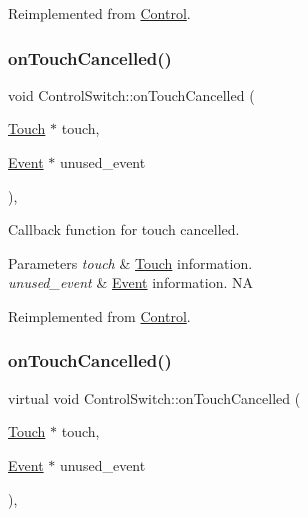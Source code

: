 Reimplemented from \hyperlink{classControl_a0cf2e20cea5b57b263e965be4a19ab52}{Control}.

\mbox{\label{classControlSwitch_aa4c6a2f3766e9916f0619a0249ddd7d7}} 
\subsubsection{\texorpdfstring{on\+Touch\+Cancelled()}{onTouchCancelled()}\hspace{0.1cm}{\footnotesize\ttfamily [1/2]}}
{\footnotesize\ttfamily void Control\+Switch\+::on\+Touch\+Cancelled (\begin{DoxyParamCaption}\item[{\hyperlink{classTouch}{Touch} $\ast$}]{touch,  }\item[{\hyperlink{classEvent}{Event} $\ast$}]{unused\+\_\+event }\end{DoxyParamCaption})\hspace{0.3cm}{\ttfamily [override]}, {\ttfamily [virtual]}}

Callback function for touch cancelled.


\begin{DoxyParams}{Parameters}
{\em touch} & \hyperlink{classTouch}{Touch} information. \\
\hline
{\em unused\+\_\+event} & \hyperlink{classEvent}{Event} information.  NA \\
\hline
\end{DoxyParams}


Reimplemented from \hyperlink{classControl_a573efad6a6b492f4a6f4c5d06f0cdb88}{Control}.

\mbox{\label{classControlSwitch_a31cc47f044081bb65d8490ac1b8900c0}} 
\subsubsection{\texorpdfstring{on\+Touch\+Cancelled()}{onTouchCancelled()}\hspace{0.1cm}{\footnotesize\ttfamily [2/2]}}
{\footnotesize\ttfamily virtual void Control\+Switch\+::on\+Touch\+Cancelled (\begin{DoxyParamCaption}\item[{\hyperlink{classTouch}{Touch} $\ast$}]{touch,  }\item[{\hyperlink{classEvent}{Event} $\ast$}]{unused\+\_\+event }\end{DoxyParamCaption})\hspace{0.3cm}{\ttfamily [override]}, {\ttfamily [virtual]}}

